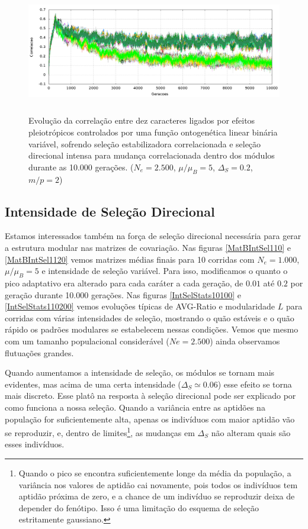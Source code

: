 \begin{figure}[htbp]
    \centering
    \includegraphics[width=150mm, height=55mm]{figuras/direcionalRMu5Ne2500IntSel200.png}
    \caption{Evolução da correlação entre dez caracteres ligados por efeitos
        pleiotrópicos controlados por uma função ontogenética linear binária
        variável, sofrendo seleção estabilizadora correlacionada
        e seleção direcional intensa para mudança correlacionada dentro dos
        módulos durante as 10.000 gerações.
    ($N_e = 2.500$, $\mu/\mu_B=5$, $\Delta_S=0.2$, $m/p=2$)}
    \label{MatBDirecionalNe2500RMu5}
\end{figure}

\subsection{Intensidade de Seleção Direcional}

Estamos interessados também na força de seleção direcional necessária
para gerar a estrutura modular nas matrizes de covariação.
Nas figuras \ref{MatBIntSel110} e \ref{MatBIntSel1120} vemos matrizes
médias finais para 10 corridas com $N_e = 1.000$, $\mu/\mu_B=5$ e
intensidade de seleção variável.
Para isso, modificamos o quanto o pico adaptativo era alterado para cada
caráter a cada geração, de $0.01$ até $0.2$ por geração durante 10.000
gerações.
Nas figuras \ref{IntSelStats10100} e \ref{IntSelStats110200} vemos
evoluções típicas de AVG-Ratio e modularidade $L$ para corridas com
várias intensidades de seleção, mostrando o quão estáveis e o quão
rápido os padrões modulares se estabelecem nessas condições.
Vemos que mesmo com um tamanho populacional considerável ($Ne = 2.500$)
ainda observamos flutuações grandes.

Quando aumentamos a intensidade de seleção, os módulos se tornam
mais evidentes, mas acima de uma certa intensidade ($\Delta_S \simeq 0.06$)
esse efeito se torna mais discreto.
Esse platô na resposta à seleção direcional pode ser explicado por como
funciona a nossa seleção.
Quando a variância entre as aptidões na população for suficientemente
alta, apenas os indivíduos com maior aptidão vão se reproduzir, e,
dentro de limites\footnote{ Quando o pico se encontra suficientemente
    longe da média da população, a variância nos valores de aptidão cai
    novamente, pois todos os indivíduos tem aptidão próxima de zero, e a
    chance de um indivíduo se reproduzir deixa de depender do fenótipo.
    Isso é uma limitação do esquema de seleção estritamente gaussiano.}, as
mudanças em $\Delta_S$ não alteram quais são esses indivíduos.

